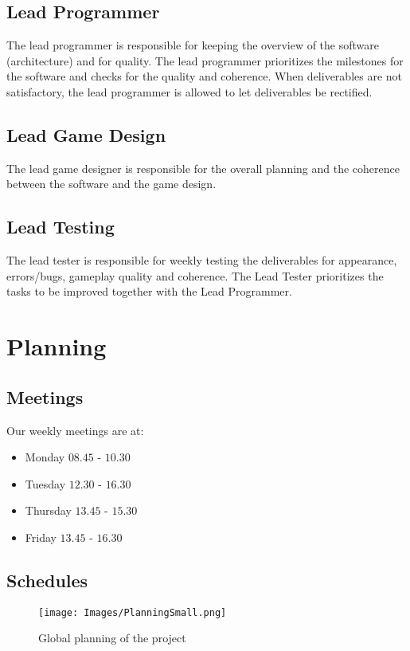 \documentclass[a4paper,11pt,notitlepage]{report}
\begin{document}
\subsection{Lead Programmer}
The lead programmer is responsible for keeping the overview of the software (architecture) and for quality. The lead programmer prioritizes the milestones for the software and checks for the quality and coherence. When deliverables are not satisfactory, the lead programmer is allowed to let deliverables be rectified.

\subsection{Lead Game Design}
The lead game designer is responsible for the overall planning and the coherence between the software and the game design. 

\subsection{Lead Testing}
The lead tester is responsible for weekly testing the deliverables for appearance, errors/bugs, gameplay quality and coherence. The Lead Tester prioritizes the tasks to be improved together with the Lead Programmer. 

\section{Planning}

\subsection{Meetings}
Our weekly meetings are at:
\begin{itemize}
	\item Monday $08.45$ - $10.30$
	\item Tuesday $12.30$ - $16.30$
	\item Thursday $13.45$ - $15.30$
	\item Friday $13.45$ - $16.30$
\end{itemize}

\subsection{Schedules}

\begin{figure}[H]
	\centering
		\texttt{[image: Images/PlanningSmall.png]}
	\caption{Global planning of the project}
	\label{fig:Planning}
\end{figure}
\end{document}
